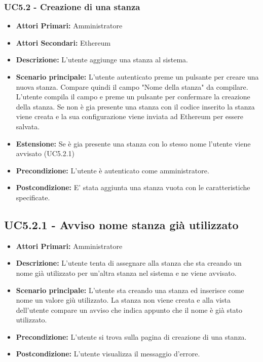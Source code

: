 \subsubsection{ UC5.2 - Creazione di una stanza}
\begin{itemize}
	\item\textbf{Attori Primari:}
	Amministratore 
	\item\textbf{Attori Secondari:}
	Ethereum
	\item\textbf{Descrizione:} 
	L'utente aggiunge una stanza al sistema.
	\item\textbf{Scenario principale:} 
	L'utente autenticato preme un pulsante per creare una nuova stanza. Compare quindi il campo "Nome della stanza" da compilare.
	L'utente compila il campo e preme un pulsante per confermare la creazione della stanza.
	Se non è gia presente una stanza con il codice inserito la stanza viene creata e la sua configurazione viene inviata ad Ethereum per essere salvata.
	\item\textbf{Estensione:}
	Se è gia presente una stanza con lo stesso nome l'utente viene avvisato (UC5.2.1)
	\item\textbf{Precondizione:} 
	L'utente è autenticato come amministratore.
	\item\textbf{Postcondizione:}
	E' stata aggiunta una stanza vuota con le caratteristiche specificate.
\end{itemize}

\subsection{ UC5.2.1 - Avviso nome stanza già utilizzato}
\begin{itemize}
	\item\textbf{Attori Primari:}
	Amministratore
	\item\textbf{Descrizione:}
	L'utente tenta di assegnare alla stanza che sta creando un nome già utilizzato per un'altra stanza nel sistema e ne viene avvisato.
	\item\textbf{Scenario principale:}
	L'utente sta creando una stanza ed inserisce come nome un valore giù utilizzato.
	La stanza non viene creata e alla vista dell'utente compare un avviso che indica appunto che il nome è già stato utilizzato.
	\item\textbf{Precondizione:}
	L'utente si trova sulla pagina di creazione di una stanza.
	\item\textbf{Postcondizione:}
	L'utente visualizza il messaggio d'errore.
	
\end{itemize}

